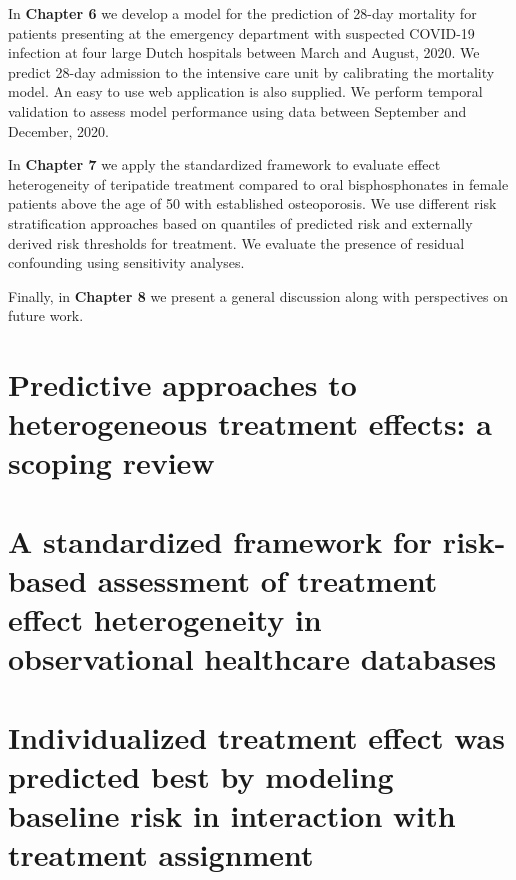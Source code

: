 \documentclass[
]{book}
\begin{document}
In \textbf{Chapter 6} we develop a model for the prediction of 28-day mortality for
patients presenting at the emergency department with suspected COVID-19
infection at four large Dutch hospitals between March and August, 2020. We
predict 28-day admission to the intensive care unit by calibrating the mortality
model. An easy to use web application is also supplied. We perform temporal
validation to assess model performance using data between September and
December, 2020.

In \textbf{Chapter 7} we apply the standardized framework to evaluate effect
heterogeneity of teripatide treatment compared to oral bisphosphonates in female
patients above the age of 50 with established osteoporosis. We use different
risk stratification approaches based on quantiles of predicted risk and
externally derived risk thresholds for treatment. We evaluate the presence of
residual confounding using sensitivity analyses.

Finally, in \textbf{Chapter 8} we present a general discussion along with
perspectives on future work.

\hypertarget{predictive-approaches-to-heterogeneous-treatment-effects-a-scoping-review}{%
\chapter{Predictive approaches to heterogeneous treatment effects: a scoping review}\label{predictive-approaches-to-heterogeneous-treatment-effects-a-scoping-review}}

\vspace*{\fill}\par
\pagebreak

\hypertarget{a-standardized-framework-for-risk-based-assessment-of-treatment-effect-heterogeneity-in-observational-healthcare-databases}{%
\chapter{A standardized framework for risk-based assessment of treatment effect heterogeneity in observational healthcare databases}\label{a-standardized-framework-for-risk-based-assessment-of-treatment-effect-heterogeneity-in-observational-healthcare-databases}}

\vspace*{\fill}\par
\pagebreak

\hypertarget{individualized-treatment-effect-was-predicted-best-by-modeling-baseline-risk-in-interaction-with-treatment-assignment}{%
\chapter{Individualized treatment effect was predicted best by modeling baseline risk in interaction with treatment assignment}\label{individualized-treatment-effect-was-predicted-best-by-modeling-baseline-risk-in-interaction-with-treatment-assignment}}
\end{document}
